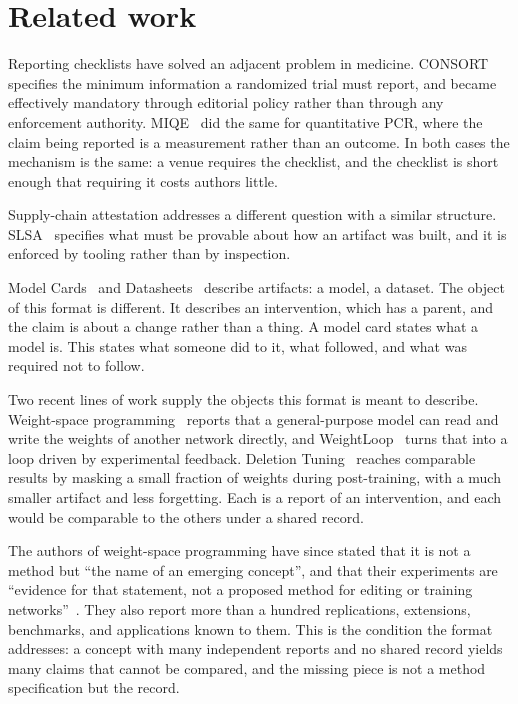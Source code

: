 \documentclass[11pt]{article}
\begin{document}
\section{Related work}

Reporting checklists have solved an adjacent problem in medicine.
CONSORT~\cite{consort} specifies the minimum information a randomized trial
must report, and became effectively mandatory through editorial policy rather
than through any enforcement authority. MIQE~\cite{miqe} did the same for
quantitative PCR, where the claim being reported is a measurement rather than
an outcome. In both cases the mechanism is the same: a venue requires the
checklist, and the checklist is short enough that requiring it costs authors
little.

Supply-chain attestation addresses a different question with a similar
structure. SLSA~\cite{slsa} specifies what must be provable about how an
artifact was built, and it is enforced by tooling rather than by inspection.

Model Cards~\cite{modelcards} and Datasheets~\cite{datasheets} describe
artifacts: a model, a dataset. The object of this format is different. It
describes an intervention, which has a parent, and the claim is about a change
rather than a thing. A model card states what a model is. This states what
someone did to it, what followed, and what was required not to follow.

Two recent lines of work supply the objects this format is meant to describe.
Weight-space programming~\cite{sparks} reports that a general-purpose model can
read and write the weights of another network directly, and
WeightLoop~\cite{weightloop} turns that into a loop driven by experimental
feedback. Deletion Tuning~\cite{deletion} reaches comparable results by masking
a small fraction of weights during post-training, with a much smaller artifact
and less forgetting. Each is a report of an intervention, and each would be
comparable to the others under a shared record.

The authors of weight-space programming have since stated that it is not a
method but ``the name of an emerging concept'', and that their experiments are
``evidence for that statement, not a proposed method for editing or training
networks''~\cite{sparks}. They also report more than a hundred replications,
extensions, benchmarks, and applications known to them. This is the condition
the format addresses: a concept with many independent reports and no shared
record yields many claims that cannot be compared, and the missing piece is not a
method specification but the record.
\end{document}
